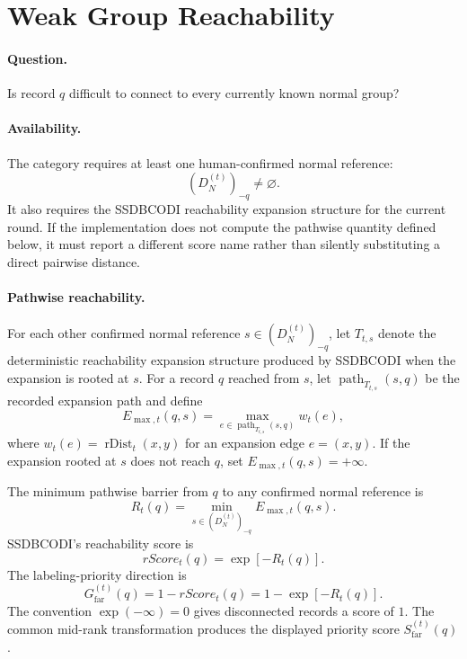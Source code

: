 \documentclass[11pt]{article}
\newcommand{\rDist}{\operatorname{rDist}}
\begin{document}
\section{Weak Group Reachability}

\paragraph{Question.}
Is record $q$ difficult to connect to every currently known normal group?

\paragraph{Availability.}
The category requires at least one human-confirmed normal reference:
\begin{equation}
    (D_N^{(t)})_{-q}\neq\varnothing.
\end{equation}
It also requires the SSDBCODI reachability expansion structure for the current
round. If the implementation does not compute the pathwise quantity defined
below, it must report a different score name rather than silently substituting
a direct pairwise distance.

\paragraph{Pathwise reachability.}
For each other confirmed normal reference $s\in(D_N^{(t)})_{-q}$, let
$T_{t,s}$ denote the
deterministic reachability expansion structure produced by SSDBCODI when the
expansion is rooted at $s$. For a record $q$ reached from $s$, let
$\operatorname{path}_{T_{t,s}}(s,q)$ be the recorded expansion path and define
\begin{equation}
    E_{\max,t}(q,s)
    =
    \max_{e\in\operatorname{path}_{T_{t,s}}(s,q)} w_t(e),
\end{equation}
where $w_t(e)=\rDist_t(x,y)$ for an expansion edge $e=(x,y)$. If the expansion
rooted at $s$ does not reach $q$, set $E_{\max,t}(q,s)=+\infty$.

The minimum pathwise barrier from $q$ to any confirmed normal reference is
\begin{equation}
    R_t(q)
    =
    \min_{s\in(D_N^{(t)})_{-q}}E_{\max,t}(q,s).
\end{equation}
SSDBCODI's reachability score is
\begin{equation}
    rScore_t(q)=\exp[-R_t(q)].
\end{equation}
The labeling-priority direction is
\begin{equation}
    \boxed{
    G_{\mathrm{far}}^{(t)}(q)
    =
    1-rScore_t(q)
    =
    1-\exp[-R_t(q)]
    }.
\end{equation}
The convention $\exp(-\infty)=0$ gives disconnected records a score of $1$.
The common mid-rank transformation produces the displayed priority score
$S_{\mathrm{far}}^{(t)}(q)$.
\end{document}
